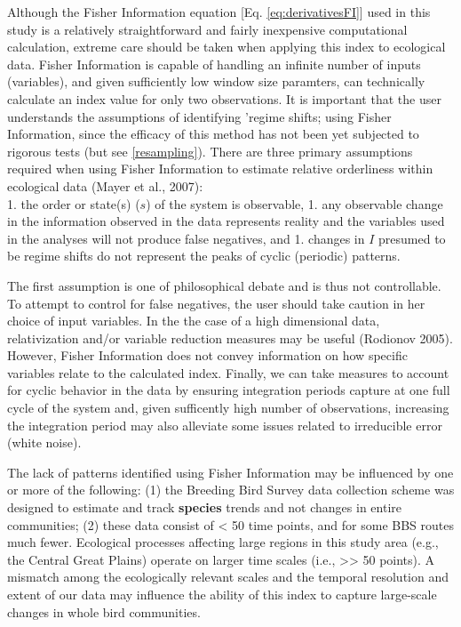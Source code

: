 \documentclass[12pt,twoside,openany]{reedthesis}
\begin{document}
Although the Fisher Information equation {[}Eq. \eqref{eq:derivativesFI}{]} used in this study is a relatively straightforward and fairly inexpensive computational calculation, extreme care should be taken when applying this index to ecological data. Fisher Information is capable of handling an infinite number of inputs (variables), and given sufficiently low window size paramters, can technically calculate an index value for only two observations. It is important that the user understands the assumptions of identifying 'regime shifts; using Fisher Information, since the efficacy of this method has not been yet subjected to rigorous tests (but see \ref{resampling}). There are three primary assumptions required when using Fisher Information to estimate relative orderliness within ecological data (Mayer et al., 2007):\\
1. the order or state(s) (\(s\)) of the system is observable,
1. any observable change in the information observed in the data represents reality and the variables used in the analyses will not produce false negatives, and
1. changes in \(I\) presumed to be regime shifts do not represent the peaks of cyclic (periodic) patterns.

The first assumption is one of philosophical debate and is thus not controllable. To attempt to control for false negatives, the user should take caution in her choice of input variables. In the the case of a high dimensional data, relativization and/or variable reduction measures may be useful (Rodionov 2005). However, Fisher Information does not convey information on how specific variables relate to the calculated index. Finally, we can take measures to account for cyclic behavior in the data by ensuring integration periods capture at one full cycle of the system and, given sufficently high number of observations, increasing the integration period may also alleviate some issues related to irreducible error (white noise).

The lack of patterns identified using Fisher Information may be influenced by one or more of the following: (1) the Breeding Bird Survey data collection scheme was designed to estimate and track \textbf{species} trends and not changes in entire communities; (2) these data consist of \textless{} 50 time points, and for some BBS routes much fewer. Ecological processes affecting large regions in this study area (e.g., the Central Great Plains) operate on larger time scales (i.e., \textgreater{}\textgreater{} 50 points). A mismatch among the ecologically relevant scales and the temporal resolution and extent of our data may influence the ability of this index to capture large-scale changes in whole bird communities.
\end{document}
